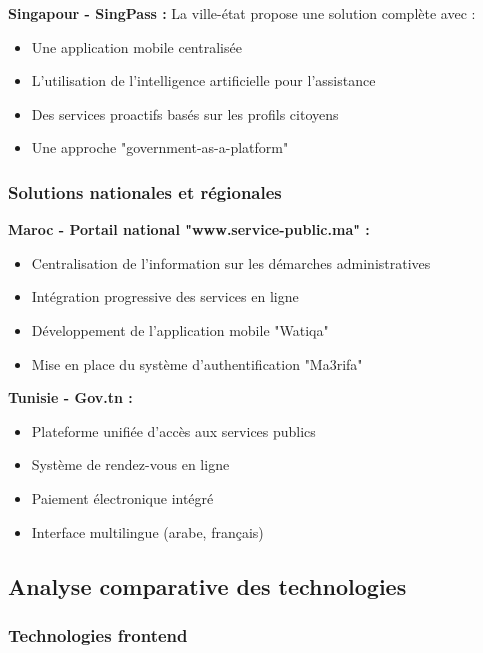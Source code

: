 \textbf{Singapour - SingPass :}
La ville-état propose une solution complète avec :
\begin{itemize}
\item Une application mobile centralisée
\item L'utilisation de l'intelligence artificielle pour l'assistance
\item Des services proactifs basés sur les profils citoyens
\item Une approche "government-as-a-platform"
\end{itemize}

\subsubsection{Solutions nationales et régionales}

\textbf{Maroc - Portail national "www.service-public.ma" :}
\begin{itemize}
\item Centralisation de l'information sur les démarches administratives
\item Intégration progressive des services en ligne
\item Développement de l'application mobile "Watiqa"
\item Mise en place du système d'authentification "Ma3rifa"
\end{itemize}

\textbf{Tunisie - Gov.tn :}
\begin{itemize}
\item Plateforme unifiée d'accès aux services publics
\item Système de rendez-vous en ligne
\item Paiement électronique intégré
\item Interface multilingue (arabe, français)
\end{itemize}

\subsection{Analyse comparative des technologies}

\subsubsection{Technologies frontend}

